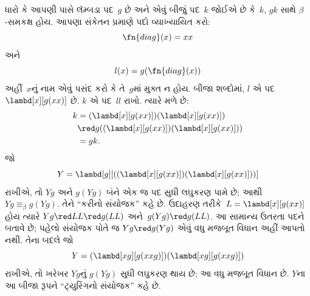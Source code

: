 \documentclass[../../../include/open-logic-section]{subfiles}
\begin{document}

ધારો કે આપણી પાસે લૅમ્બડા પદ~$g$ છે અને એવું બીજું પદ~$k$ જોઈએ છે
કે~$k$, $gk$ સાથે $\beta$-સમકક્ષ હોય. આપણા સંકેતન પ્રમાણે પદો
વ્યાખ્યાયિત કરો:
\[
\fn{diag}(x) = xx
\]
અને
\[
l(x) = g(\fn{diag}(x))
\]
અહીં~$x$નું નામ એવું પસંદ કરો કે તે~$g$માં મુક્ત ન હોય.
બીજા શબ્દોમાં, $l$ એ પદ~$\lambd[x][g(xx)]$ છે. $k$ એ પદ~$ll$
રાખો. ત્યારે મળે છે:
\begin{align*}
k & = (\lambd[x][g(xx)])(\lambd[x][g(xx)]) \\
& \red  g((\lambd[x][g(xx)])(\lambd[x][g(xx)])) \\
& = gk.
\end{align*}
જો
\[
Y = \lambd[g][((\lambd[x][g(xx)])(\lambd[x][g(xx)]))]
\]
રાખીએ, તો $Yg$ અને $g(Yg)$ બંને એક જ પદ સુધી લઘુકરણ પામે છે;
આથી $Yg \equiv_\beta g(Yg)$. તેને ``કરીનો સંયોજક'' કહે છે.
ઉદાહરણ તરીકે~$L=\lambd[x][g(xx)]$ હોય ત્યારે
$Yg\red LL\red g(LL)$ અને~$g(Yg)\red g(LL)$.
આ સામાન્ય ઉતરતા પદને બતાવે છે; પહેલો સંયોજક પોતે જ
$Yg\red g(Yg)$ એવું વધુ મજબૂત વિધાન અહીં આપતો નથી. તેના
બદલે જો
\[
Y = (\lambd[xg][g(xxg)])(\lambd[xg][g(xxg)])
\]
રાખીએ, તો ખરેખર $Yg$નું $g(Yg)$ સુધી લઘુકરણ થાય છે; આ વધુ
મજબૂત વિધાન છે. $Y$ના આ બીજા રૂપને ``ટ્યુરિંગનો સંયોજક'' કહે છે.
\end{document}
